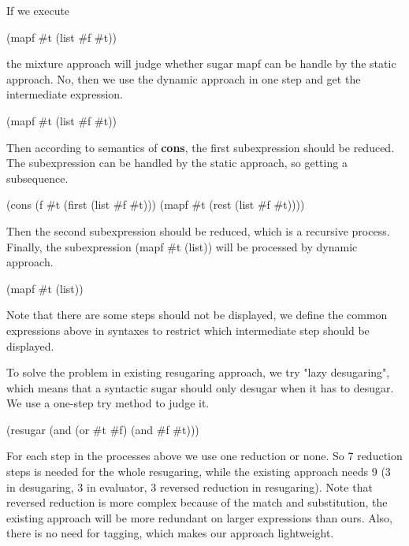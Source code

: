 {If we execute
\begin{Codes}
(mapf \#t (list \#f \#t))
\end{Codes}
 the mixture approach will judge whether sugar mapf can be handle by the static approach. No, then we use the dynamic approach in one step and get the intermediate expression.
\begin{Codes}
    (mapf \#t (list \#f \#t))
\end{Codes}
Then according to semantics of {\bfseries cons}, the first subexpression should be reduced. The subexpression can be handled by the static approach, so getting a subsequence.
\begin{Codes}
    (cons (f \#t (first (list \#f \#t))) (mapf \#t (rest (list \#f \#t))))
\end{Codes}
Then the second subexpression should be reduced, which is a recursive process. Finally, the subexpression (mapf \#t (list)) will be processed by dynamic approach.
\begin{Codes}
   (mapf \#t (list))
\end{Codes}
Note that there are some steps should not be displayed, we define the common expressions above in syntaxes to restrict which intermediate step should be displayed.
}

To solve the problem in existing resugaring approach, we try "lazy desugaring", which means that a syntactic sugar should only desugar when it has to desugar. We use a one-step try method to judge it.
\begin{Codes}
    (resugar (and (or \#t \#f) (and \#f \#t)))
 
 
 
 
 
 
\end{Codes} 

For each step in the processes above we use one reduction or none. So 7 reduction steps is needed for the whole resugaring, while the existing approach needs 9 (3 in desugaring, 3 in evaluator, 3 reversed reduction in resugaring). Note that reversed reduction is more complex because of the match and substitution, the existing approach will be more redundant on larger expressions than ours. Also, there is no need for tagging, which makes our approach lightweight.

